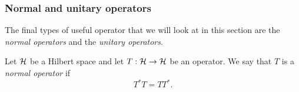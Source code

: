 \subsubsection{Normal and unitary operators}

The final types of useful operator that we will look at in this section are the {\emph{normal operators}} and the {\emph{unitary operators}}.

\begin{definition}
  Let $\mathcal{H}$ be a Hilbert space and let $T: \mathcal{H} \to \mathcal{H}$ be an operator. We say that $T$ is a {\emph{normal operator}} if \[T^* T = T T^*.\]
\end{definition}



